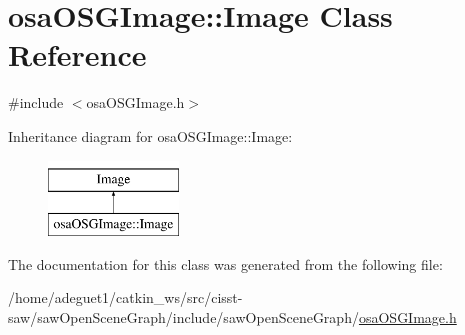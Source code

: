 \hypertarget{classosa_o_s_g_image_1_1_image}{\section{osa\-O\-S\-G\-Image\-:\-:Image Class Reference}
\label{classosa_o_s_g_image_1_1_image}
}


{\ttfamily \#include $<$osa\-O\-S\-G\-Image.\-h$>$}

Inheritance diagram for osa\-O\-S\-G\-Image\-:\-:Image\-:\begin{figure}[H]
\begin{center}
\leavevmode
\includegraphics[height=2.000000cm]{d0/d80/classosa_o_s_g_image_1_1_image}
\end{center}
\end{figure}


The documentation for this class was generated from the following file\-:\begin{DoxyCompactItemize}
\item 
/home/adeguet1/catkin\-\_\-ws/src/cisst-\/saw/saw\-Open\-Scene\-Graph/include/saw\-Open\-Scene\-Graph/\hyperlink{osa_o_s_g_image_8h}{osa\-O\-S\-G\-Image.\-h}\end{DoxyCompactItemize}
